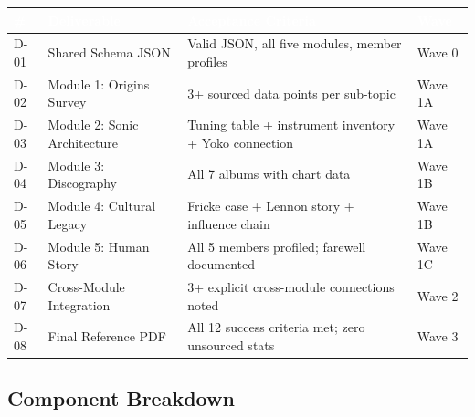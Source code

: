 \documentclass[11pt,letterpaper]{article}
\newcommand{\tableheader}[1]{\textbf{\sffamily\textcolor{white}{#1}}}
\begin{document}
\begin{center}
\begin{tabularx}{\textwidth}{C{0.8cm}L{3.5cm}L{4cm}X}
\toprule
{}
\tableheader{\#} & \tableheader{Deliverable} & \tableheader{Acceptance Criteria} & \tableheader{Wave} \\
\midrule
D-01 & Shared Schema JSON & Valid JSON, all five modules, member profiles & Wave 0 \\
D-02 & Module 1: Origins Survey & 3+ sourced data points per sub-topic & Wave 1A \\
D-03 & Module 2: Sonic Architecture & Tuning table + instrument inventory + Yoko connection & Wave 1A \\
D-04 & Module 3: Discography & All 7 albums with chart data & Wave 1B \\
D-05 & Module 4: Cultural Legacy & Fricke case + Lennon story + influence chain & Wave 1B \\
D-06 & Module 5: Human Story & All 5 members profiled; farewell documented & Wave 1C \\
D-07 & Cross-Module Integration & 3+ explicit cross-module connections noted & Wave 2 \\
D-08 & Final Reference PDF & All 12 success criteria met; zero unsourced stats & Wave 3 \\
\bottomrule
\end{tabularx}
\end{center}

\subsection{Component Breakdown}
\end{document}
